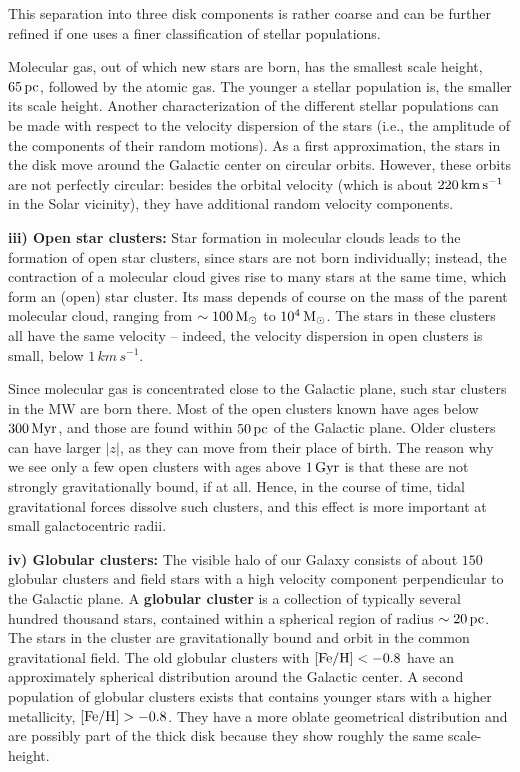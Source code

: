 \documentclass[a4paper,10pt]{article}
\begin{document}
{\noindent}This separation into three disk components is rather coarse and can be further refined if one uses a finer classification of stellar populations.

{\noindent}Molecular gas, out of which new stars are born, has the smallest scale height, $65\,{\rm pc}$, followed by the atomic gas. The younger a stellar population is, the smaller its scale height. Another characterization of the different stellar populations can be made with respect to the velocity dispersion of the stars (i.e., the amplitude of the components of their random motions). As a first approximation, the stars in the disk move around the Galactic center on circular orbits. However, these orbits are not perfectly circular: besides the orbital velocity (which is about $220\,{\rm km\,s^{-1}}$ in the Solar vicinity), they have additional random velocity components.

{\noindent}\textbf{iii) Open star clusters:} Star formation in molecular clouds leads to the formation of open star clusters, since stars are not born individually; instead, the contraction of a molecular cloud gives rise to many stars at the same time, which form an (open) star cluster. Its mass depends of course on the mass of the parent molecular cloud, ranging from  $\sim100\,{\rm M_\odot}$ to   $10^4\,{\rm M_\odot}$. The stars in these clusters all have the same velocity -- indeed, the velocity dispersion in open clusters is small, below $1\,{km\,s^{-1}}$.

{\noindent}Since molecular gas is concentrated close to the Galactic plane, such star clusters in the MW are born there. Most of the open clusters known have ages below $300\,{\rm Myr}$, and those are found within $50\,{\rm pc}$ of the Galactic plane. Older clusters can have larger $|z|$, as they can move from their place of birth. The reason why we see only a few open clusters with ages above $1\,{\rm Gyr}$ is that these are not strongly gravitationally bound, if at all. Hence, in the course of time, tidal gravitational forces dissolve such clusters, and this effect is more important at small galactocentric radii.

{\noindent}\textbf{iv) Globular clusters:} The visible halo of our Galaxy consists of about $150$ globular clusters and field stars with a high velocity component perpendicular to the Galactic plane. A \textbf{globular cluster} is a collection of typically several hundred thousand stars, contained within a spherical region of radius $\sim20\,{\rm pc}$. The stars in the cluster are gravitationally bound and orbit in the common gravitational field. The old globular clusters with $[{\rm Fe/H}]<-0.8$ have an approximately spherical distribution around the Galactic center. A second population of globular clusters exists that contains younger stars with a higher metallicity, $[{\rm Fe/H}]>-0.8$. They have a more oblate geometrical distribution and are possibly part of the thick disk because they show roughly the same scale-height.
\end{document}
